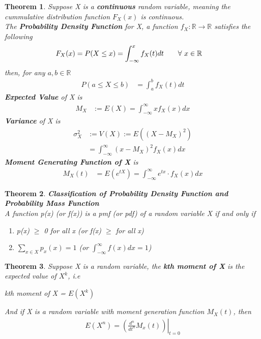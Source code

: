 \documentclass[11pt,oneside]{book}
\theoremstyle{break}
\theoremstyle{break}
\newtheorem{thm}{Theorem}[section]
\newcommand{\R}{\mathbb{R}}
\newcommand{\X}{x}
\begin{document}
\begin{thm}
Suppose X is a \textbf{continuous} random variable, meaning the cummulative distribution function $F_X(\X)$ is continuous.\\
The \textbf{Probability Density Function} for X, a function $f_X:\R \rightarrow \R$ satisfies the following \begin{align*}
F_X(\X)&=P(X\leq \X)=\int_{-\infty}^{\X}f_X(t)dt \text{\qquad} \forall \text{ }\X\in \mathbb{R}
\end{align*}
then, for any $a,b\in \R$\begin{align*}
P(a\leq X\leq b)&=\int_{a}^{b}f_X(t)dt
\end{align*}
\textbf{Expected Value} of X is \begin{align*}
M_X&:=E(X)=\int_{-\infty}^{\infty}\X f_X(\X)d\X
\end{align*}
\textbf{Variance} of X is\begin{align*}
\sigma_X^2&:=V(X):=E((X-M_X)^2)\\
&=\int_{-\infty}^{\infty}(\X-M_X)^2 f_X(\X)d\X
\end{align*}
\textbf{Moment Generating Function of X} is \begin{align*}
M_X(t)&=E(e^{tX})=\int_{-\infty}^{\infty}e^{tx}\cdot f_X(x)dx
\end{align*}
\end{thm}
\begin{thm}
\textbf{Classification of Probability Density Function and Probability Mass Function}\\
A function p(x) (or f(x)) is a pmf (or pdf) of a random variable X if and only if \begin{enumerate}
\item p(x) $\geq$ 0 for all x (or f(x) $\geq$ for all x)
\item $\sum_{x\in X}p_x(x)=1$ (or $\int_{-\infty}^{\infty}f(x)dx=1$)
\end{enumerate}
\end{thm}
\begin{thm}
Suppose X is a random variable, the \textbf{kth moment of X} is the expected value of $X^k$, i.e\begin{center}
kth moment of X = $E(X^k)$
\end{center}
And if X is a random variable with moment generation function $M_X(t)$, then \begin{align*}
E(X^n)=\left( \left. \frac{d^n}{dt^n}M_x(t)\right) \right|_{t=0}
\end{align*}
\end{thm}
\end{document}
